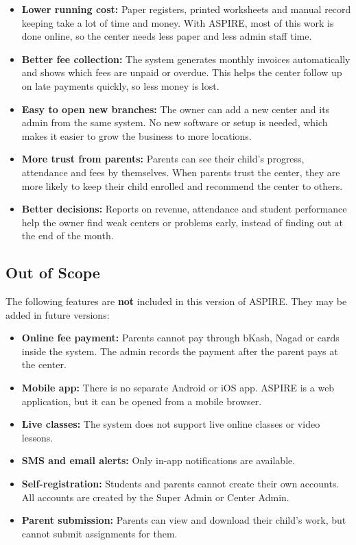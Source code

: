 \begin{itemize}
  \item \textbf{Lower running cost:} Paper registers, printed worksheets and manual
        record keeping take a lot of time and money. With ASPIRE, most of this work
        is done online, so the center needs less paper and less admin staff time.

  \item \textbf{Better fee collection:} The system generates monthly invoices
        automatically and shows which fees are unpaid or overdue. This helps the
        center follow up on late payments quickly, so less money is lost.

  \item \textbf{Easy to open new branches:} The owner can add a new center and its
        admin from the same system. No new software or setup is needed, which makes
        it easier to grow the business to more locations.

  \item \textbf{More trust from parents:} Parents can see their child's progress,
        attendance and fees by themselves. When parents trust the center, they are
        more likely to keep their child enrolled and recommend the center to others.

  \item \textbf{Better decisions:} Reports on revenue, attendance and student
        performance help the owner find weak centers or problems early, instead of
        finding out at the end of the month.
\end{itemize}

\subsection{Out of Scope}
The following features are \textbf{not} included in this version of ASPIRE. They
may be added in future versions:

\begin{itemize}
  \item \textbf{Online fee payment:} Parents cannot pay through bKash, Nagad or
        cards inside the system. The admin records the payment after the parent
        pays at the center.
  \item \textbf{Mobile app:} There is no separate Android or iOS app. ASPIRE is a
        web application, but it can be opened from a mobile browser.
  \item \textbf{Live classes:} The system does not support live online classes or
        video lessons.
  \item \textbf{SMS and email alerts:} Only in-app notifications are available.
  \item \textbf{Self-registration:} Students and parents cannot create their own
        accounts. All accounts are created by the Super Admin or Center Admin.
  \item \textbf{Parent submission:} Parents can view and download their child's
        work, but cannot submit assignments for them.
\end{itemize}
